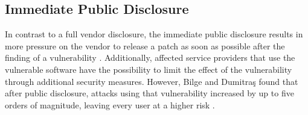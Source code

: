 \subsection{Immediate Public Disclosure}
\label{sec:immediate-public}

In contrast to a full vendor disclosure, the immediate public disclosure results in more pressure on the vendor to release a patch as soon as possible after the finding of a vulnerability \cite{Cavusoglu2007}. Additionally, affected service providers that use the vulnerable software have the possibility to limit the effect of the vulnerability through additional security measures. However, Bilge and Dumitra\c{s} found that after public disclosure, attacks using that vulnerability increased by up to five orders of magnitude, leaving every user at a higher risk \cite{Bilge:2012:BWK:2382196.2382284}.